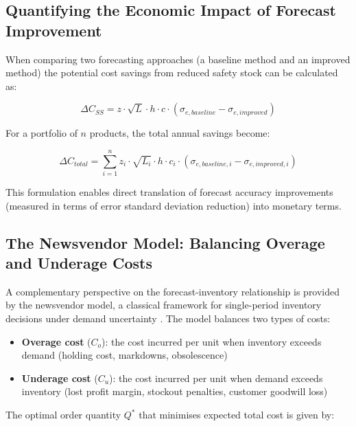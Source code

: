 \documentclass[ENG]{TFUOC}%
\begin{document}
\subsection{Quantifying the Economic Impact of Forecast Improvement}

When comparing two forecasting approaches (a baseline method and an improved method) the potential cost savings from reduced safety stock can be calculated as:

\begin{equation}
\Delta C_{SS} = z \cdot \sqrt{L} \cdot h \cdot c \cdot (\sigma_{e,baseline} - \sigma_{e,improved})
\label{eq:cost_savings}
\end{equation}

For a portfolio of $n$ products, the total annual savings become:

\begin{equation}
\Delta C_{total} = \sum_{i=1}^{n} z_i \cdot \sqrt{L_i} \cdot h \cdot c_i \cdot (\sigma_{e,baseline,i} - \sigma_{e,improved,i})
\label{eq:total_savings}
\end{equation}

This formulation enables direct translation of forecast accuracy improvements (measured in terms of error standard deviation reduction) into monetary terms.

\subsection{The Newsvendor Model: Balancing Overage and Underage Costs}

A complementary perspective on the forecast-inventory relationship is provided by the newsvendor model, a classical framework for single-period inventory decisions under demand uncertainty \citep{raz2013newsvendor, silver2016inventory}. The model balances two types of costs:

\begin{itemize}
    \item \textbf{Overage cost} ($C_o$): the cost incurred per unit when inventory exceeds demand (holding cost, markdowns, obsolescence)
    \item \textbf{Underage cost} ($C_u$): the cost incurred per unit when demand exceeds inventory (lost profit margin, stockout penalties, customer goodwill loss)
\end{itemize}

The optimal order quantity $Q^*$ that minimises expected total cost is given by:
\end{document}
